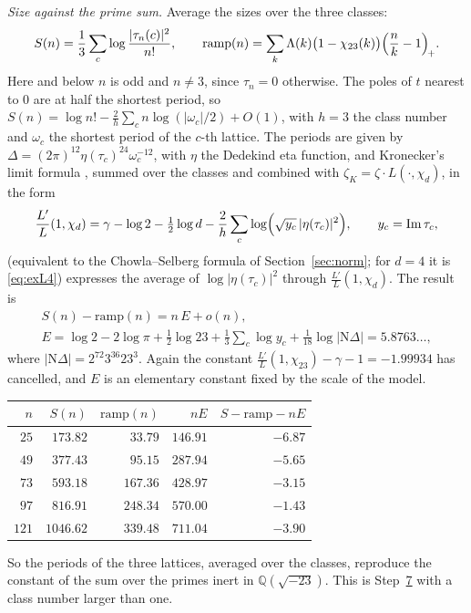 \documentclass[11pt]{amsart}
\numberwithin{equation}{section}
\theoremstyle{definition}
\theoremstyle{remark}
\newcommand{\Q}{\mathbb Q}
\newcommand{\im}{\operatorname{Im}}
\begin{document}
\emph{Size against the prime sum.} Average the sizes over the three classes:
\begin{equation}\label{eq:exS23}
 S(n)=\frac13\sum_c\log\frac{|\tau_n(c)|^2}{n!},\qquad\mathrm{ramp}(n)=\sum_k\Lambda(k)\bigl(1-\chi_{23}(k)\bigr)\Bigl(\frac nk-1\Bigr)_{\!+}.
\end{equation}
Here and below $n$ is odd and $n\ne3$, since $\tau_n=0$ otherwise. The poles of $t$ nearest to $0$ are at half the shortest period, so $S(n)=\log n!-\frac2h\sum_c n\log(|\omega_c|/2)+O(1)$, with $h=3$ the class number and $\omega_c$ the shortest period of the $c$-th lattice. The periods are given by $\Delta=(2\pi)^{12}\eta(\tau_c)^{24}\omega_c^{-12}$, with $\eta$ the Dedekind eta function, and Kronecker's limit formula \cite{siegelTata}, summed over the classes and combined with $\zeta_K=\zeta\cdot L(\cdot,\chi_d)$, in the form
\begin{equation}\label{eq:exKron}
 \frac{L'}{L}(1,\chi_d)=\gamma-\log2-\tfrac12\log d-\frac2h\sum_c\log\Bigl(\sqrt{y_c}\,|\eta(\tau_c)|^2\Bigr),\qquad y_c=\im\tau_c,
\end{equation}
(equivalent to the Chowla--Selberg formula of Section~\ref{sec:norm}; for $d=4$ it is \eqref{eq:exL4}) expresses the average of $\log|\eta(\tau_c)|^2$ through $\frac{L'}L(1,\chi_d)$. The result is
\begin{gather}
 S(n)-\mathrm{ramp}(n)=n\,E+o(n),\label{eq:exmatch23}\\
 E=\log2-2\log\pi+\tfrac12\log23+\frac13\sum_c\log y_c+\frac1{18}\log|\mathrm N\Delta|=5.8763\ldots,\label{eq:exE}
\end{gather}
where $|\mathrm N\Delta|=2^{72}3^{36}23^3$. Again the constant $\frac{L'}L(1,\chi_{23})-\gamma-1=-1.99934$ has cancelled, and $E$ is an elementary constant fixed by the scale of the model.
\begin{center}\small
\begin{tabular}{@{}rrrrr@{}}
\toprule
$n$ & $S(n)$ & $\mathrm{ramp}(n)$ & $nE$ & $S-\mathrm{ramp}-nE$\\
\midrule
$25$ & $173.82$ & $33.79$ & $146.91$ & $-6.87$\\
$49$ & $377.43$ & $95.15$ & $287.94$ & $-5.65$\\
$73$ & $593.18$ & $167.36$ & $428.97$ & $-3.15$\\
$97$ & $816.91$ & $248.34$ & $570.00$ & $-1.43$\\
$121$ & $1046.62$ & $339.48$ & $711.04$ & $-3.90$\\
\bottomrule
\end{tabular}
\end{center}
So the periods of the three lattices, averaged over the classes, reproduce the constant of the sum over the primes inert in $\Q(\sqrt{-23})$. This is Step~\hyperref[step:7]{7} with a class number larger than one.
\end{document}
